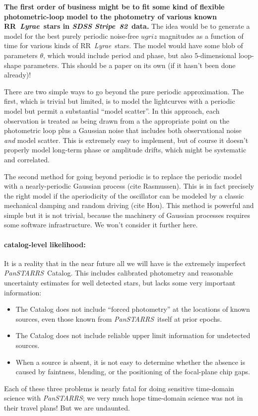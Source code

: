 \documentclass[12pt]{article}
\newcommand{\project}[1]{\textsl{#1}}
\newcommand{\ps}{\project{PanSTARRS}}
\newcommand{\stripe}{\project{SDSS Stripe~82}}
\newcommand{\rrl}{RR~\textit{Lyrae}}
\begin{document}
\textbf{The first order of business might be to fit some kind of
  flexible photometric-loop model to the photometry of various known
  \rrl\ stars in \stripe\ data.}  The idea would be to generate a
model for the best purely periodic noise-free $ugriz$ magnitudes as a
function of time for various kinds of \rrl\ stars.  The model would
have some blob of parameters $\theta$, which would include period and
phase, but also 5-dimensional loop-shape parameters.  This should be a
paper on its own (if it hasn't been done already)!

There are two simple ways to go beyond the pure periodic
approximation.  The first, which is trivial but limited, is to model
the lightcurves with a periodic model but permit a substantial ``model
scatter''.  In this approach, each observation is treated as being
drawn from a the appropriate point on the photometric loop plus a
Gaussian noise that includes both observational noise \emph{and} model
scatter.  This is extremely easy to implement, but of course it
doesn't properly model long-term phase or amplitude drifts, which
might be systematic and correlated.

The second method for going beyond periodic is to replace the periodic
model with a nearly-periodic Gaussian process (cite Rasmussen).  This
is in fact precisely the right model if the aperiodicity of the
oscillator can be modeled by a classic mechanical damping and random
driving (cite Hou).  This method is powerful and simple but it is not
trivial, because the machinery of Gaussian processes requires some
software infrastructure.  We won't consider it further here.

\paragraph{catalog-level likelihood:}
It is a reality that in the near future all we will have is the
extremely imperfect \ps\ Catalog.  This includes calibrated photometry
and reasonable uncertainty estimates for well detected stars, but
lacks some very important information:
\begin{itemize}
\item
The Catalog does not include ``forced photometry'' at the locations of
known sources, even those known from \ps\ itself at prior epochs.
\item
The Catalog does not include reliable upper limit information for
undetected sources.
\item
When a source is absent, it is not easy to determine whether the
absence is caused by faintness, blending, or the positioning of the
focal-plane chip gaps.
\end{itemize}
Each of these three problems is nearly fatal for doing sensitive
time-domain science with \ps; we very much hope time-domain science
was not in their travel plans!  But we are undaunted.
\end{document}
